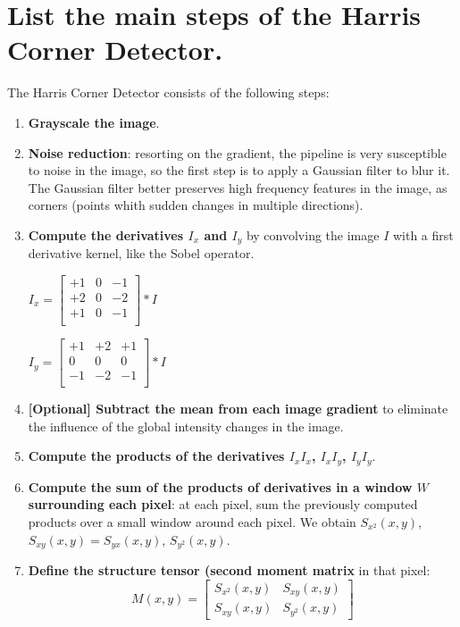 \documentclass{article}
\begin{document}
\newpage

\section{List the main steps of the Harris Corner Detector.}

The Harris Corner Detector consists of the following steps:

\begin{enumerate}[start=0]
    \item \textbf{Grayscale the image}.
    \item \textbf{Noise reduction}: resorting on the gradient, the pipeline is very susceptible to noise in the image, so the first step is to apply a Gaussian filter to blur it. The Gaussian filter better preserves high frequency features in the image, as corners (points whith sudden changes in multiple directions). 
    \item \textbf{Compute the derivatives $I_x$ and $I_y$} by convolving the image $I$ with a first derivative kernel, like the Sobel operator.
        \begin{center}
        $I_x = 
        \begin{bmatrix}
        +1 & 0 & -1 \\
        +2 & 0 & -2 \\
        +1 & 0 & -1 \\
        \end{bmatrix} * I$
    
        $I_y = 
        \begin{bmatrix}
        +1 & +2 & +1 \\
        0 & 0 & 0 \\
        -1 & -2 & -1 \\
        \end{bmatrix} * I$
        \end{center}
    \item \textbf{[Optional] Subtract the mean from each image gradient} to eliminate the influence of the global intensity changes in the image.
    \item \textbf{Compute the products of the derivatives $I_x I_x$, $I_x I_y$, $I_y I_y$}.
    \item \textbf{Compute the sum of the products of derivatives in a window $W$ surrounding each pixel}: at each pixel, sum the previously computed products over a small window around each pixel. We obtain $S_{x^2}(x,y)$, $S_{xy}(x,y)=S_{yx}(x,y)$, $S_{y^2}(x,y)$.
    \item \textbf{Define the structure tensor (second moment matrix} in that pixel:
        \begin{equation*}
        M(x,y) = 
        \begin{bmatrix}
        S_{x^2}(x,y) & S_{xy}(x,y) \\
        S_{xy}(x,y) & S_{y^2}(x,y)
        \end{bmatrix}
        \end{equation*}


\end{enumerate}
\end{document}
